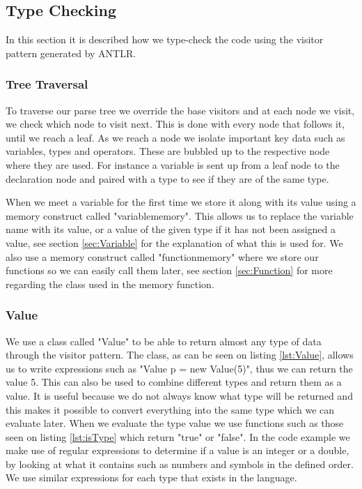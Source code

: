 \subsection{Type Checking}
\label{sec:typecheck}
In this section it is described how we type-check the code using the visitor pattern generated by ANTLR.

\subsubsection{Tree Traversal}
To traverse our parse tree we override the base visitors and at each node we visit, we check which node to visit next. This is done with every node that follows it, until we reach a leaf. As we reach a node we isolate important key data such as variables, types and operators. These are bubbled up to the respective node where they are used. For instance a variable is sent up from a leaf node to the declaration node and paired with a type to see if they are of the same type.

When we meet a variable for the first time we store it along with its value using a memory construct called "variablememory". This allows us to replace the variable name with its value, or a value of the given type if it has not been assigned a value, see section \ref{sec:Variable} for the explanation of what this is used for. We also use a memory construct called "functionmemory" where we store our functions so we can easily call them later, see section \ref{sec:Function} for more regarding the class used in the memory function.

\subsubsection{Value}
We use a class called "Value" to be able to return almost any type of data through the visitor pattern.
The class, as can be seen on listing \ref{lst:Value}, allows us to write expressions such as "Value p = new Value(5)", thus we can return the value 5. This can also be used to combine different types and return them as a value. It is useful because we do not always know what type will be returned and this makes it possible to convert everything into the same type which we can evaluate later.
When we evaluate the type value we use functions such as those seen on listing \ref{lst:isType} which return "true" or "false". In the code example we make use of regular expressions to determine if a value is an integer or a double, by looking at what it contains such as numbers and symbols in the defined order. We use similar expressions for each type that exists in the language.

